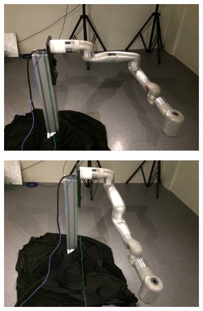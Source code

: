 \begin{figure}
	\centering
	\begin{minipage}{.5\textwidth}
		\centering
		\includegraphics[width=0.9\textwidth]{./images/Pose14}
		\label{fig:pose14}
	\end{minipage}%
	\begin{minipage}{.5\textwidth}
		\centering
		\includegraphics[width=0.9\textwidth]{./images/Pose15}
		\label{fig:pose15}
	\end{minipage}
\end{figure}



